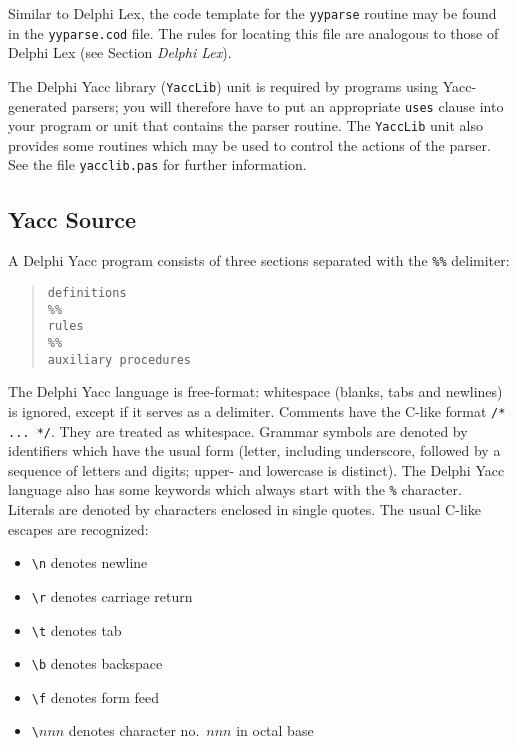 \documentclass[a4paper]{article}
\begin{document}
Similar to Delphi Lex, the code template for the \verb"yyparse" routine may be
found in the \verb"yyparse.cod" file. The rules for locating this file are
analogous to those of Delphi Lex (see Section {\em Delphi Lex\/}).

The Delphi Yacc library (\verb"YaccLib") unit is required by programs using Yacc-
generated parsers; you will therefore have to put an appropriate \verb"uses"
clause into your program or unit that contains the parser routine. The
\verb"YaccLib" unit also provides some routines which may be used to control
the actions of the parser. See the file \verb"yacclib.pas" for further
information.

\subsection{Yacc Source}

A Delphi Yacc program consists of three sections separated with the \verb"%%"
delimiter:

\begin{quote}\begin{verbatim}
definitions
%%
rules
%%
auxiliary procedures
\end{verbatim}\end{quote}

The Delphi Yacc language is free-format: whitespace (blanks, tabs and newlines)
is ignored, except if it serves as a delimiter. Comments have the C-like
format \verb"/* ... */". They are treated as whitespace. Grammar symbols are
denoted by identifiers which have the usual form (letter, including
underscore, followed by a sequence of letters and digits; upper- and
lowercase is distinct). The Delphi Yacc language also has some keywords which
always start with the \verb"%" character. Literals are denoted by characters
enclosed in single quotes. The usual C-like escapes are recognized:

\begin{itemize}
   \item \verb"\n"     denotes newline
   \item \verb"\r"     denotes carriage return
   \item \verb"\t"     denotes tab
   \item \verb"\b"     denotes backspace
   \item \verb"\f"     denotes form feed
   \item \verb"\"$nnn$ denotes character no.\ $nnn$ in octal base
\end{itemize}
\end{document}
